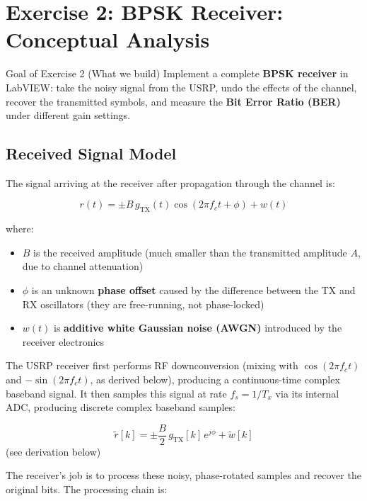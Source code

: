 \newpage
\section{Exercise 2: BPSK Receiver: Conceptual Analysis}
\label{sec:ex2-analysis}

\begin{GoalBox}{Goal of Exercise 2 (What we build)}
Implement a complete \textbf{BPSK receiver} in LabVIEW: take the noisy signal from the USRP, undo the effects of the channel, recover the transmitted symbols, and measure the \textbf{Bit Error Ratio (BER)} under different gain settings.
\end{GoalBox}

\subsection{Received Signal Model}

The signal arriving at the receiver after propagation through the channel is:

\begin{equation}
r(t) = \pm B\,g_{\text{TX}}(t)\cos(2\pi f_c t + \phi) + w(t)
\end{equation}

where:

\begin{itemize}
\item $B$ is the received amplitude (much smaller than the transmitted amplitude $A$, due to channel attenuation)
\item $\phi$ is an unknown \textbf{phase offset} caused by the difference between the TX and RX oscillators (they are free-running, not phase-locked)
\item $w(t)$ is \textbf{additive white Gaussian noise (AWGN)} introduced by the receiver electronics
\end{itemize}

The USRP receiver first performs RF downconversion (mixing with $\cos(2\pi f_c t)$ and $-\sin(2\pi f_c t)$, as derived below), producing a continuous-time complex baseband signal. It then samples this signal at rate $f_s = 1/T_x$ via its internal ADC, producing discrete complex baseband samples:

\begin{equation}
\tilde{r}[k] = \pm \frac{B}{2}\,g_{\text{TX}}[k]\,e^{j\phi} + \tilde{w}[k]
\end{equation} (see derivation below)

The receiver's job is to process these noisy, phase-rotated samples and recover the original bits. The processing chain is:

